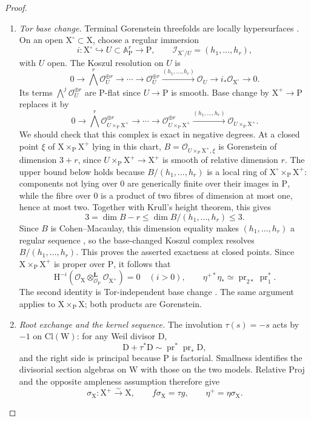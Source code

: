 \documentclass[a4paper,10pt]{article}
\newcommand{\X}{\mathrm{X}}
\newcommand{\W}{\mathrm{W}}
\newcommand{\Pj}{\mathrm{P}}
\newcommand{\OO}{\mathcal O}
\theoremstyle{remark}
\theoremstyle{plain}
\begin{document}
\begin{proof}
\begin{enumerate}
\item \emph{Tor base change.}
Terminal Gorenstein threefolds are locally hypersurfaces
\cite{Reid}. On an open $\X^\circ\subset\X$, choose a regular immersion
\[
i:\X^\circ\hookrightarrow U\subset\mathbb A^r_\Pj\longrightarrow\Pj,
\qquad
\mathcal I_{\X^\circ/U}=(h_1,\ldots,h_r),
\]
with $U$ open. The Koszul resolution on $U$ is
\[
0\longrightarrow\bigwedge^r\OO_U^{\oplus r}
\longrightarrow\cdots\longrightarrow\OO_U^{\oplus r}
\xrightarrow{(h_1,\ldots,h_r)}\OO_U
\longrightarrow i_*\OO_{\X^\circ}\longrightarrow0.
\]
Its terms $\bigwedge^j\OO_U^{\oplus r}$ are $\Pj$-flat since
$U\to\Pj$ is smooth. Base change by $\X^+\to\Pj$ replaces it by
\[
0\longrightarrow\bigwedge^r\OO_{U\times_\Pj\X^+}^{\oplus r}
\longrightarrow\cdots\longrightarrow\OO_{U\times_\Pj\X^+}^{\oplus r}
\xrightarrow{(h_1,\ldots,h_r)}\OO_{U\times_\Pj\X^+}.
\]
We should check that this complex is exact in negative degrees.
At a closed point $\xi$ of $\X\times_\Pj\X^+$ lying in this chart,
$B=\OO_{U\times_\Pj\X^+,\xi}$ is Gorenstein of dimension $3+r$,
since $U\times_\Pj\X^+\to\X^+$ is smooth of relative dimension $r$.
The upper bound below holds because $B/(h_1,\ldots,h_r)$ is a local
ring of $\X^\circ\times_\Pj\X^+$: components not lying over $0$ are
generically finite over their images in $\Pj$, while the fibre over $0$
is a product of two fibres of dimension at most one, hence at most two.
Together with Krull's height theorem, this gives
\[
3=\dim B-r\le\dim B/(h_1,\ldots,h_r)\le3.
\]
Since $B$ is Cohen--Macaulay, this dimension equality makes
$(h_1,\ldots,h_r)$ a regular sequence \cite[\href{https://stacks.math.columbia.edu/tag/02JN}{Tag~02JN}]{Stacks},
so the base-changed Koszul complex resolves $B/(h_1,\ldots,h_r)$.
This proves the asserted exactness at closed points. Since
$\X\times_\Pj\X^+$ is proper over $\Pj$, it follows that
\begin{equation}\label{eq:tor}
\mathrm H^{-i}\!\left(\OO_\X\otimes^{\mathbf L}_{\OO_\Pj}\OO_{\X^+}\right)=0
\quad(i>0),
\qquad
\eta^{+*}\eta_*\simeq
\operatorname{pr}_{2*}\operatorname{pr}_1^*.
\end{equation}
The second identity is Tor-independent base change
\cite[\href{https://stacks.math.columbia.edu/tag/08IB}{Tag~08IB}]{Stacks}. The same argument applies to $\X\times_\Pj\X$;
both products are Gorenstein.

\item \emph{Root exchange and the kernel sequence.}
The involution $\tau(s)=-s$ acts by $-1$ on $\mathrm{Cl}(\W)$:
for any Weil divisor $\mathrm{D}$,
\[
\mathrm{D}+\tau^*\mathrm{D}\sim\operatorname{pr}^*\operatorname{pr}_*\mathrm{D},
\]
and the right side is principal because $\Pj$ is factorial.
Smallness identifies the divisorial section algebras on $\W$ with
those on the two models. Relative Proj and the opposite ampleness
assumption therefore give \cite[Proposition 2.2, Example 2.3]{Kollar}
\[
\sigma_\X:\X^+\xrightarrow{\sim}\X,
\qquad f\sigma_\X=\tau g,
\qquad \eta^+=\eta\sigma_\X.
\]


\end{enumerate}
\end{proof}
\end{document}
